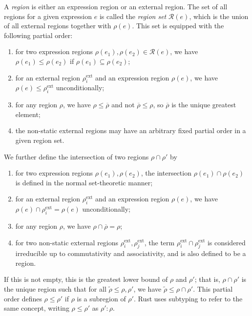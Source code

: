 \documentclass[11pt]{book}
\newcommand{\lstatic}{\ensuremath{\overline\rho}}
\begin{document}
\begin{defn}
  A \textit{region} is either an expression region or an external region.
  The set of all regions for a given expression \( e \) is called the \textit{region set} \( \mathcal R(e) \), which is the union of all external regions together with \( \rho(e) \).
  This set is equipped with the following partial order:
  \begin{enumerate}
    \item for two expression regions \( \rho(e_1), \rho(e_2) \in \mathcal R(e) \), we have \( \rho(e_1) \leq \rho(e_2) \) if \( \rho(e_1) \subseteq \rho(e_2) \);
    \item for an external region \( \rho_i^{\mathrm{ext}} \) and an expression region \( \rho(e) \), we have \( \rho(e) \leq \rho_i^{\mathrm{ext}} \) unconditionally;
    \item for any region \( \rho \), we have \( \rho \leq \lstatic \) and not \( \lstatic \leq \rho \), so \( \lstatic \) is the unique greatest element;
    \item the non-static external regions may have an arbitrary fixed partial order in a given region set.
  \end{enumerate}
  We further define the intersection of two regions \( \rho \cap \rho' \) by
  \begin{enumerate}
    \item for two expression regions \( \rho(e_1), \rho(e_2) \), the intersection \( \rho(e_1) \cap \rho(e_2) \) is defined in the normal set-theoretic manner;
    \item for an external region \( \rho_i^{\mathrm{ext}} \) and an expression region \( \rho(e) \), we have \( \rho(e) \cap \rho_i^{\mathrm{ext}} = \rho(e) \) unconditionally;
    \item for any region \( \rho \), we have \( \rho \cap \lstatic = \rho \);
    \item for two non-static external regions \( \rho_i^{\mathrm{ext}}, \rho_j^{\mathrm{ext}} \), the term \( \rho_i^{\mathrm{ext}} \cap \rho_j^{\mathrm{ext}} \) is considered irreducible up to commutativity and associativity, and is also defined to be a region.
  \end{enumerate}
  If this is not empty, this is the greatest lower bound of \( \rho \) and \( \rho' \); that is, \( \rho \cap \rho' \) is the unique region such that for all \( \widetilde \rho \leq \rho, \rho' \), we have \( \widetilde \rho \leq \rho \cap \rho' \).
  This partial order defines \( \rho \leq \rho' \) if \( \rho \) is a subregion of \( \rho' \).
  Rust uses subtyping to refer to the same concept, writing \( \rho \leq \rho' \) as \( \rho' : \rho \).
\end{defn}
\end{document}
